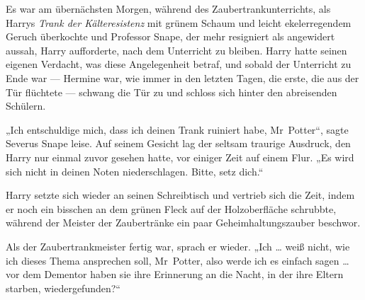 Es war am übernächsten Morgen, während des Zaubertrankunterrichts, als Harrys \emph{Trank der Kälteresistenz} mit grünem Schaum und leicht ekelerregendem Geruch überkochte und Professor Snape, der mehr resigniert als angewidert aussah, Harry aufforderte, nach dem Unterricht zu bleiben. Harry hatte seinen eigenen Verdacht, was diese Angelegenheit betraf, und sobald der Unterricht zu Ende war — Hermine war, wie immer in den letzten Tagen, die erste, die aus der Tür flüchtete — schwang die Tür zu und schloss sich hinter den abreisenden Schülern.

„Ich entschuldige mich, dass ich deinen Trank ruiniert habe, Mr~Potter“, sagte Severus Snape leise. Auf seinem Gesicht lag der seltsam traurige Ausdruck, den Harry nur einmal zuvor gesehen hatte, vor einiger Zeit auf einem Flur.
„Es wird sich nicht in deinen Noten niederschlagen. Bitte, setz dich.“

Harry setzte sich wieder an seinen Schreibtisch und vertrieb sich die Zeit, indem er noch ein bisschen an dem grünen Fleck auf der Holzoberfläche schrubbte, während der Meister der Zaubertränke ein paar Geheimhaltungszauber beschwor.

Als der Zaubertrankmeister fertig war, sprach er wieder.
„Ich … weiß nicht, wie ich dieses Thema ansprechen soll, Mr~Potter, also werde ich es einfach sagen … vor dem Dementor haben sie ihre Erinnerung an die Nacht, in der ihre Eltern starben, wiedergefunden?“


